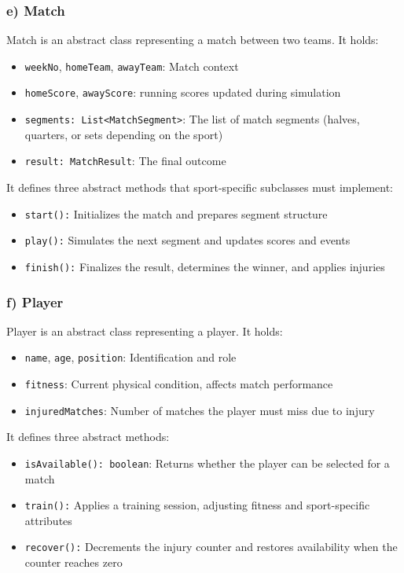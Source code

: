 \documentclass[12pt, a4paper]{article}
\begin{document}
\subsubsection*{e) Match}

Match is an abstract class representing a match between two teams. It holds:

\begin{itemize}
    \item \texttt{weekNo}, \texttt{homeTeam}, \texttt{awayTeam}: Match context
    \item \texttt{homeScore}, \texttt{awayScore}: running scores updated during simulation
    \item \texttt{segments: List<MatchSegment>}: The list of match segments (halves, quarters, or sets depending on the sport)
    \item \texttt{result: MatchResult}: The final outcome
\end{itemize}

It defines three abstract methods that sport-specific subclasses must implement:

\begin{itemize}
    \item \texttt{start():} Initializes the match and prepares segment structure
    \item \texttt{play():} Simulates the next segment and updates scores and events
    \item \texttt{finish():} Finalizes the result, determines the winner, and applies injuries
\end{itemize}

\subsubsection*{f) Player}

Player is an abstract class representing a player. It holds:

\begin{itemize}
    \item \texttt{name}, \texttt{age}, \texttt{position}: Identification and role
    \item \texttt{fitness}: Current physical condition, affects match performance
    \item \texttt{injuredMatches}: Number of matches the player must miss due to injury
\end{itemize}

It defines three abstract methods:

\begin{itemize}
    \item \texttt{isAvailable(): boolean}: Returns whether the player can be selected for a match
    \item \texttt{train():} Applies a training session, adjusting fitness and sport-specific attributes
    \item \texttt{recover():} Decrements the injury counter and restores availability when the counter reaches zero
\end{itemize}
\end{document}
